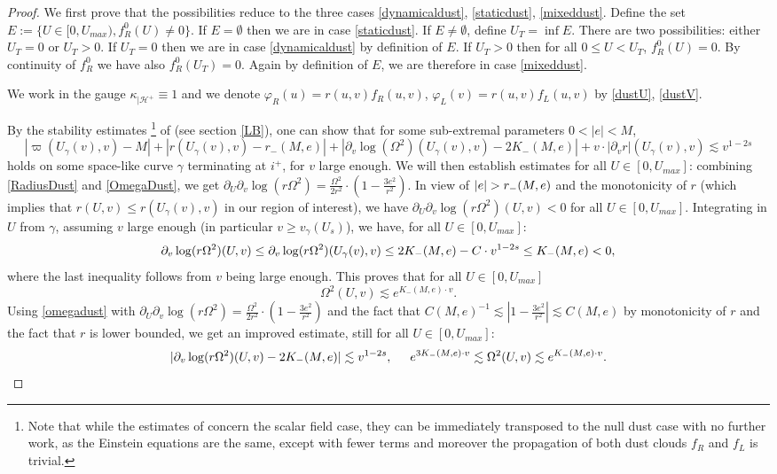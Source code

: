 \documentclass[10pt,a4paper]{article}
\theoremstyle{plain}
\theoremstyle{remark}
\theoremstyle{definition}
\theoremstyle{plain}
\theoremstyle{remark}
\theoremstyle{definition}
\numberwithin{equation}{section}
\begin{document}
\begin{proof} We first prove that the possibilities reduce to the three cases \ref{dynamicaldust}, \ref{staticdust}, \ref{mixeddust}. Define the set $E:=\{U\in[0,U_{max}),  f_R^0(U)\neq 0\}$. If $E=\emptyset$ then we are in case \ref{staticdust}. If $E \neq\emptyset$, define $U_T=\inf E$. There are two possibilities: either $U_T=0$ or $U_T>0$. If $U_T=0$ then we are in case  \ref{dynamicaldust} by definition of $E$. If $U_T>0$ then for all $0 \leq U < U_T$, $f_R^0(U)= 0$. By continuity of $f_R^0$ we have also $f_R^0(U_T)= 0$. Again by definition of $E$, we are therefore in case \ref{mixeddust}.
	
	
	\color{black}
	We work in the gauge $\kappa_{|\mathcal{H}^+} \equiv 1$ and we denote $\varphi_R(u)= r(u,v) f_R(u,v)$, $\varphi_L(v)= r(u,v) f_L(u,v)$ by \eqref{dustU}, \eqref{dustV}.
	
	By the stability estimates \footnote{Note that while the estimates of \cite{Moi} concern the scalar field case, they can be immediately transposed to the null dust case with no further work, as the Einstein equations are the same, except with fewer terms and moreover the propagation of both dust clouds $f_R$ and $f_L$ is trivial.} of \cite{Moi} (see section \ref{LB}), one can show that for some sub-extremal parameters $0<|e|<M$, $$ |\varpi(U_{\gamma}(v),v)-M|+ |r(U_{\gamma}(v),v)-r_-(M,e)|+ |\partial_v \log(\Omega^2)(U_{\gamma}(v),v)-2K_-(M,e)| + v \cdot |\partial_v r| (U_{\gamma}(v),v)\lesssim v^{1-2s}$$ holds on some space-like curve $\gamma$ terminating at $i^+$,  for $v$ large enough.  We will then establish estimates for all $U \in [0,U_{max}]$: combining \eqref{RadiusDust} and \eqref{OmegaDust}, we get $ \partial_U \partial_v \log(r \Omega^2) = \frac{ \Omega^{2}}{2r^{2}} \cdot (1- \frac{ 3 e^{2}}{r^{2}})$. In view of $|e| \color{black} > r_-(M,e)$ and the monotonicity of $r$ (which implies that $r(U,v)\leq r(U_{\gamma}(v),v) $ in our region of interest), we have  $ \partial_U \partial_v \log(r \Omega^2)(U,v) <0$ for all $U \in [0,U_{max}]$. Integrating in $U$ from $\gamma$,  assuming $v$ large enough (in particular $v\geq v_{\gamma}(U_s)$)\color{black}, we have, for all $U \in [0,U_{max}]$: $$ \partial_v\log(r\Omega^2)(U,v)  \leq \partial_v\log(r\Omega^2)(U_{\gamma}(v),v) \leq 2K_-(M,e) - C \cdot v^{1-2s}\color{black} \leq K_-(M,e)<0,$$ where the last inequality follows from $v$ being large enough. This proves that for all $U \in [0,U_{max}]$ \begin{equation} \label{omegadust}
	\Omega^2(U,v) \lesssim e^{K_-(M,e) \cdot v }.
	\end{equation}
	Using \eqref{omegadust} with $\partial_U \partial_v \log(r \Omega^2) = \frac{ \Omega^{2}}{2r^{2}} \cdot (1- \frac{ 3 e^{2}}{r^{2}})$ and the fact that $ C(M,e)^{-1} \lesssim |1- \frac{ 3 e^{2}}{r^{2}}| \lesssim C(M,e)$ by monotonicity of $r$ and the fact that $r$ is lower bounded, we get an improved estimate, still for all  $U \in [0,U_{max}]$: \begin{equation}  \label{omegadust2}
	|\partial_v \log(r \Omega^2)(U,v) -2K_-(M,e) | \lesssim v^{1-2s}, \hskip 5 mm  e^{3K_-(M,e) \cdot v } \lesssim   \Omega^2(U,v) \lesssim e^{K_-(M,e) \cdot v }.
	\end{equation}
	

\end{proof}
\end{document}
